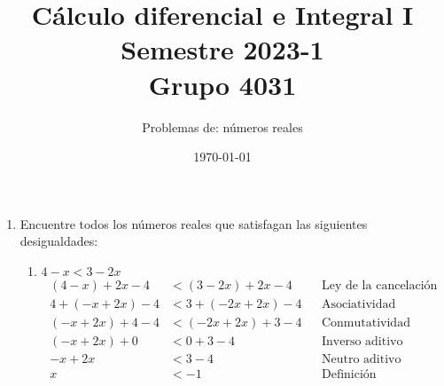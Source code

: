 \documentclass[11pt]{article}
\begin{document}
\title{\vspace{-2cm}Cálculo diferencial e Integral I \\ Semestre 2023-1 \\ Grupo 4031}
\author{Problemas de: números reales \\ }
\date{\today}
\maketitle
\thispagestyle{empty}

\begin{enumerate}
 \item Encuentre todos los números reales que satisfagan las siguientes desigualdades: \begin{enumerate}[label=(\alph*)]
  \item $4-x<3-2x$
  \begin{align*}
   (4-x)+2x-4&< (3-2x)+2x-4 && \text{Ley de la cancelación}\\
   4+(-x+2x)-4 &< 3+(-2x+2x)-4 && \text{Asociatividad}\\
   (-x+2x)+4-4 &< (-2x+2x)+3-4 && \text{Conmutatividad}\\
   (-x+2x)+0 &< 0+3-4 && \text{Inverso aditivo}\\
   -x+2x &< 3-4 && \text{Neutro aditivo}\\
   x &< -1 && \text{Definición}
  \end{align*}


\end{enumerate}
\end{enumerate}
\end{document}
